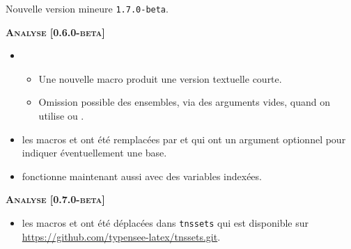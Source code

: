 Nouvelle version mineure \verb+1.7.0-beta+.




\begin{center}
    \textbf{\textsc{Analyse [0.6.0-beta]}}
\end{center}

\begin{itemize}[itemsep=.5em]
    \item {}
    \begin{itemize}[itemsep=.5em]
        \item Une nouvelle macro  produit une version textuelle courte.

        \item Omission possible des ensembles, via des arguments vides, quand on utilise  ou .
    \end{itemize}


    \item {}
          les macros  et  ont été remplacées par  et  qui ont un argument optionnel pour indiquer éventuellement une base.


    \item {}
           fonctionne maintenant aussi avec des variables indexées.
          
\end{itemize}


\begin{center}
    \textbf{\textsc{Analyse [0.7.0-beta]}}
\end{center}

\begin{itemize}[itemsep=.5em]
    \item {}
          les macros  et  ont été déplacées dans \verb#tnssets# qui est disponible sur \url{https://github.com/typensee-latex/tnssets.git}.
    
\end{itemize}


\separation




